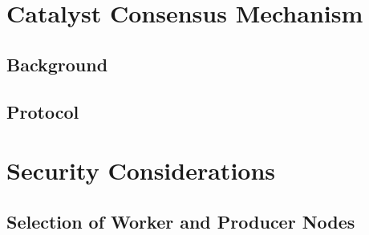 \documentclass[a4paper, 12pt]{book}
\begin{document}
\chapter{Catalyst Consensus Mechanism} \label{Cha:CM}





\section{Background}\label{Sec:Cbg}



\section{Protocol}\label{Sec:Dem}





%



%


\chapter{Security Considerations} \label{Cha:Sec}




\section{Selection of Worker and Producer Nodes}\label{Sec:ConSec}


\end{document}
